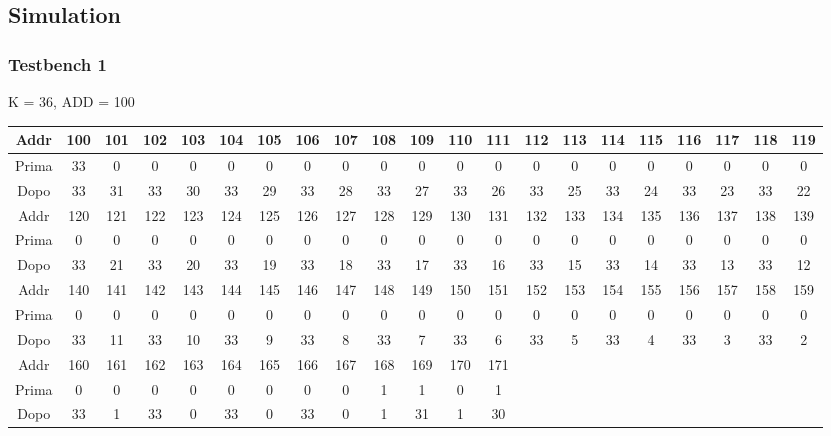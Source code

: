 \documentclass{article}
\begin{document}
\subsection{Simulation}

\subsubsection{Testbench 1}

K = 36, ADD = 100
\begin{table}[htbp]
    \begin{adjustwidth}{-1.75cm}{}
    \centering
    \begin{tabular}{|c|*{20}{c|}}
        \hline
        Addr & 100 & 101 & 102 & 103 & 104 & 105 & 106 & 107 & 108 & 109 & 110 & 111 & 112 & 113 & 114 & 115 & 116 & 117 & 118 & 119 \\
        \hline
        Prima & 33 & 0 & 0 & 0 & 0 & 0 & 0 & 0 & 0 & 0 & 0 & 0 & 0 & 0 & 0 & 0 & 0 & 0 & 0 & 0 \\
        Dopo & 33 & 31 & 33 & 30 & 33 & 29 & 33 & 28 & 33 & 27 & 33 & 26 & 33 & 25 & 33 & 24 & 33 & 23 & 33 & 22 \\
        \hline
        Addr & 120 & 121 & 122 & 123 & 124 & 125 & 126 & 127 & 128 & 129 & 130 & 131 & 132 & 133 & 134 & 135 & 136 & 137 & 138 & 139 \\
        \hline
        Prima & 0 & 0 & 0 & 0 & 0 & 0 & 0 & 0 & 0 & 0 & 0 & 0 & 0 & 0 & 0 & 0 & 0 & 0 & 0 & 0 \\
        Dopo & 33 & 21 & 33 & 20 & 33 & 19 & 33 & 18 & 33 & 17 & 33 & 16 & 33 & 15 & 33 & 14 & 33 & 13 & 33 & 12 \\
        \hline
        Addr & 140 & 141 & 142 & 143 & 144 & 145 & 146 & 147 & 148 & 149 & 150 & 151 & 152 & 153 & 154 & 155 & 156 & 157 & 158 & 159 \\
        \hline
        Prima & 0 & 0 & 0 & 0 & 0 & 0 & 0 & 0 & 0 & 0 & 0 & 0 & 0 & 0 & 0 & 0 & 0 & 0 & 0 & 0 \\
        Dopo & 33 & 11 & 33 & 10 & 33 & 9 & 33 & 8 & 33 & 7 & 33 & 6 & 33 & 5 & 33 & 4 & 33 & 3 & 33 & 2 \\
        \hline
        Addr & 160 & 161 & 162 & 163 & 164 & 165 & 166 & 167 & 168 & 169 & 170 & 171 & & & & & & & & \\
        \hline
        Prima & 0 & 0 & 0 & 0 & 0 & 0 & 0 & 0 & 1 & 1 & 0 & 1 & & & & & & & & \\
        Dopo & 33 & 1 & 33 & 0 & 33 & 0 & 33 & 0 & 1 & 31 & 1 & 30 & & & & & & & & \\
        \hline
    \end{tabular}
    \end{adjustwidth}
\end{table}
\end{document}
